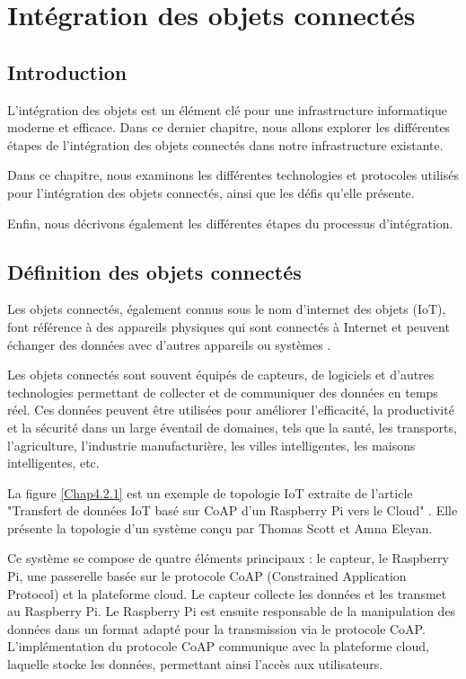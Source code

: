 \chapter{Intégration des objets connectés}

\section{Introduction}

L'intégration des objets est un élément clé pour une infrastructure informatique moderne et efficace. Dans ce dernier chapitre, nous allons explorer les différentes étapes de l'intégration des objets connectés dans notre infrastructure existante. 

Dans ce chapitre, nous examinons les différentes technologies et protocoles utilisés pour l'intégration des objets connectés, ainsi que les défis qu'elle présente. 

Enfin, nous décrivons également les différentes étapes du processus d'intégration. 

\section{Définition des objets connectés}

Les objets connectés, également connus sous le nom d'internet des objets (IoT), font référence à des appareils physiques qui sont connectés à Internet et peuvent échanger des données avec d'autres appareils ou systèmes \cite{gazis2021iot}.

Les objets connectés sont souvent équipés de capteurs, de logiciels et d'autres technologies permettant de collecter et de communiquer des données en temps réel. Ces données peuvent être utilisées pour améliorer l'efficacité, la productivité et la sécurité dans un large éventail de domaines, tels que la santé, les transports, l'agriculture, l'industrie manufacturière, les villes intelligentes, les maisons intelligentes, etc.

La figure \ref{Chap4.2.1} est un exemple de topologie IoT extraite de l'article "Transfert de données IoT basé sur CoAP d'un Raspberry Pi vers le Cloud" \cite{Scott2019CoAPBI}. Elle présente la topologie d'un système conçu par Thomas Scott et Amna Eleyan.

Ce système se compose de quatre éléments principaux : le capteur, le Raspberry Pi, une passerelle basée sur le protocole CoAP (Constrained Application Protocol) et la plateforme cloud. Le capteur collecte les données et les transmet au Raspberry Pi. Le Raspberry Pi est ensuite responsable de la manipulation des données dans un format adapté pour la transmission via le protocole CoAP. L'implémentation du protocole CoAP communique avec la plateforme cloud, laquelle stocke les données, permettant ainsi l'accès aux utilisateurs.

